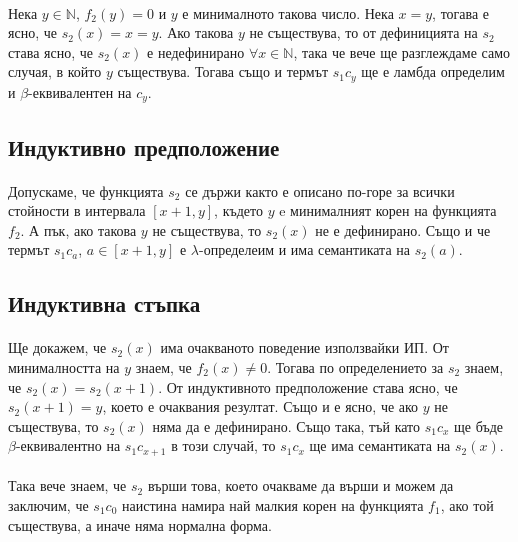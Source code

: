 \documentclass[12pt]{article}
\begin{document}
\paragraph*{}
Нека $y \in \mathbb{N}$, $f_2(y) = 0$ и $y$ е минималното такова число. Нека $x = y$, тогава е ясно, че $s_2(x) = x = y$. Ако такова $y$ не съществува, то от дефиницията на $s_2$ става ясно, че $s_2(x)$ е недефинирано $\forall x \in \mathbb{N}$, така че вече ще разглеждаме само случая, в който $y$ съществува. Тогава също и термът $s_1 c_y$ ще е ламбда определим и $\beta$-еквивалентен на $c_y$.

\subsection*{Индуктивно предположение}
\paragraph*{}
Допускаме, че функцията $s_2$ се държи както е описано по-горе за всички стойности в интервала $[x+1, y]$, където $y$ e минималният корен на функцията $f_2$. А пък, ако такова $y$ не съществува, то $s_2(x)$ не е дефинирано. Също и че термът $s_1 c_a$, $a \in [x+1, y]$ е $\lambda$-определеим и има семантиката на $s_2(a)$.     

\subsection*{Индуктивна стъпка}
\paragraph*{}
Ще докажем, че $s_2(x)$ има очакваното поведение използвайки ИП. От минималността на $y$ знаем, че $f_2(x) \neq 0$. Тогава по определението за $s_2$ знаем, че $s_2(x) = s_2(x+1)$. От индуктивното предположение става ясно, че $s_2(x+1) = y$, което е очаквания резултат. Също и е ясно, че ако $y$ не съществува, то $s_2(x)$ няма да е дефинирано. Също така, тъй като $s_1 c_x$ ще бъде $\beta$-еквивалентно на $s_1 c_{x+1}$ в този случай, то $s_1 c_x$ ще има семантиката на $s_2(x)$.

\paragraph*{}
Така вече знаем, че $s_2$ върши това, което очакваме да върши и можем да заключим, че $s_1 c_0$ наистина намира най малкия корен на функцията $f_1$, ако той съществува, а иначе няма нормална форма. 
\end{document}
